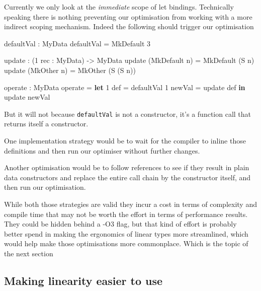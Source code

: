 \documentclass[
]{article}
\newenvironment{Shaded}{}{}
\newcommand{\DataTypeTok}[1]{\textcolor[rgb]{0.56,0.13,0.00}{#1}}
\newcommand{\DecValTok}[1]{\textcolor[rgb]{0.25,0.63,0.44}{#1}}
\newcommand{\KeywordTok}[1]{\textcolor[rgb]{0.00,0.44,0.13}{\textbf{#1}}}
\newcommand{\NormalTok}[1]{#1}
\newcommand{\OperatorTok}[1]{\textcolor[rgb]{0.40,0.40,0.40}{#1}}
\newcommand{\OtherTok}[1]{\textcolor[rgb]{0.00,0.44,0.13}{#1}}
\begin{document}
Currently we only look at the \emph{immediate} scope of let bindings.
Technically speaking there is nothing preventing our optimisation from
working with a more indirect scoping mechanism. Indeed the following
should trigger our optimisation

\begin{Shaded}
\begin{Highlighting}[]
\NormalTok{defaultVal }\OperatorTok{:} \DataTypeTok{MyData}
\NormalTok{defaultVal }\OtherTok{=} \DataTypeTok{MkDefault} \DecValTok{3}

\NormalTok{update }\OperatorTok{:}\NormalTok{ (}\DecValTok{1}\NormalTok{ rec }\OperatorTok{:} \DataTypeTok{MyData}\NormalTok{) }\OtherTok{{-}\textgreater{}} \DataTypeTok{MyData}
\NormalTok{update (}\DataTypeTok{MkDefault}\NormalTok{ n) }\OtherTok{=} \DataTypeTok{MkDefault}\NormalTok{ (}\DataTypeTok{S}\NormalTok{ n)}
\NormalTok{update (}\DataTypeTok{MkOther}\NormalTok{ n) }\OtherTok{=} \DataTypeTok{MkOther}\NormalTok{ (}\DataTypeTok{S}\NormalTok{ (}\DataTypeTok{S}\NormalTok{ n))}

\NormalTok{operate }\OperatorTok{:} \DataTypeTok{MyData}
\NormalTok{operate }\OtherTok{=} \KeywordTok{let} \DecValTok{1}\NormalTok{ def }\OtherTok{=}\NormalTok{ defaultVal}
              \DecValTok{1}\NormalTok{ newVal }\OtherTok{=}\NormalTok{ update def }\KeywordTok{in}
\NormalTok{              update newVal}
\end{Highlighting}
\end{Shaded}

But it will not because \texttt{defaultVal} is not a constructor, it's a
function call that returns itself a constructor.

One implementation strategy would be to wait for the compiler to inline
those definitions and then run our optimiser without further changes.

Another optimisation would be to follow references to see if they result
in plain data constructors and replace the entire call chain by the
constructor itself, and then run our optimisation.

While both those strategies are valid they incur a cost in terms of
complexity and compile time that may not be worth the effort in terms of
performance results. They could be hidden behind a -O3 flag, but that
kind of effort is probably better spend in making the ergonomics of
linear types more streamlined, which would help make those optimisations
more commonplace. Which is the topic of the next section

\hypertarget{making-linearity-easier-to-use}{%
\subsection{Making linearity easier to
use}\label{making-linearity-easier-to-use}}
\end{document}
